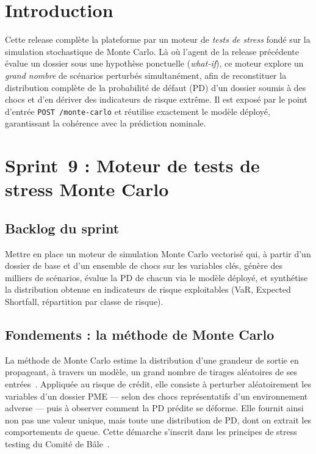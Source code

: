 \documentclass[a4paper,12pt,oneside]{report}
\begin{document}
\section*{Introduction}

Cette release complète la plateforme par un moteur de \emph{tests de stress} fondé sur la
simulation stochastique de Monte Carlo. Là où l'agent de la release précédente évalue un
dossier sous une hypothèse ponctuelle (\textit{what-if}), ce moteur explore un \emph{grand
nombre} de scénarios perturbés simultanément, afin de reconstituer la distribution complète de
la probabilité de défaut (PD) d'un dossier soumis à des chocs et d'en dériver des indicateurs
de risque extrême. Il est exposé par le point d'entrée \texttt{POST /monte-carlo} et réutilise
exactement le modèle déployé, garantissant la cohérence avec la prédiction nominale.

\section{Sprint~9 : Moteur de tests de stress Monte Carlo}

\subsection{Backlog du sprint}

Mettre en place un moteur de simulation Monte Carlo vectorisé qui, à partir d'un dossier de
base et d'un ensemble de chocs sur les variables clés, génère des milliers de scénarios,
évalue la PD de chacun via le modèle déployé, et synthétise la distribution obtenue en
indicateurs de risque exploitables (VaR, Expected Shortfall, répartition par classe de risque).

\subsection{Fondements : la méthode de Monte Carlo}

La méthode de Monte Carlo estime la distribution d'une grandeur de sortie en propageant, à
travers un modèle, un grand nombre de tirages aléatoires de ses entrées~\cite{glasserman2004,
metropolis1949}. Appliquée au risque de crédit, elle consiste à perturber aléatoirement les
variables d'un dossier PME — selon des chocs représentatifs d'un environnement adverse — puis à
observer comment la PD prédite se déforme. Elle fournit ainsi non pas une valeur unique, mais
toute une distribution de PD, dont on extrait les comportements de queue. Cette démarche
s'inscrit dans les principes de stress testing du Comité de Bâle~\cite{bcbs2018}.
\end{document}
